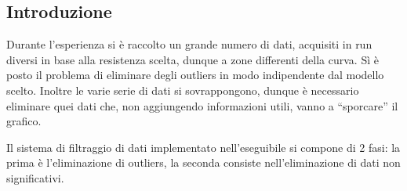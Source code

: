 \documentclass{article}[a4paper, oneside, 11pt]
\begin{document}
\subsection{Introduzione}
Durante l’esperienza si è raccolto un grande numero di dati, acquisiti in
run diversi in base alla resistenza scelta, dunque a zone differenti della
curva. Sì è posto il problema di eliminare degli outliers in modo
indipendente dal modello scelto. Inoltre le varie serie di dati si
sovrappongono, dunque è necessario eliminare quei dati che, non aggiungendo
informazioni utili, vanno a “sporcare” il grafico.

Il sistema di filtraggio di dati implementato nell'eseguibile si compone di 2
fasi: la prima è l’eliminazione di outliers, la seconda consiste
nell'eliminazione di dati non significativi.

\end{document}
